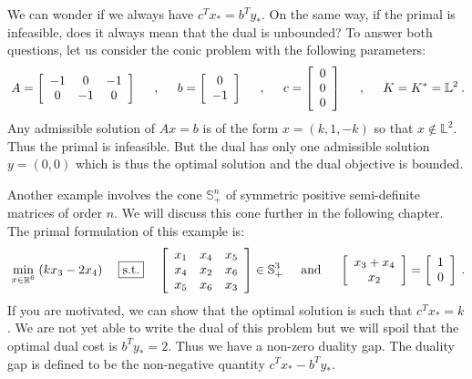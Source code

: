 \documentclass[12pt,a4paper]{article}
\theoremstyle{definition}
\theoremstyle{plain}
\DeclareMathOperator{\reals}{\mathbb{R}}
\DeclareMathOperator{\suchthat}{\;\;\;\;\boxed{\text{s.t.}}\;\;\;\;}
\begin{document}
We can wonder if we always have $c^Tx_* = b^Ty_*$. On the same way, if the primal is infeasible, does it always mean that the dual is unbounded? To answer both questions, let us consider the conic problem with the following parameters:
\begin{align*}
\: A = \left[\begin{array}{ccc} -1 & 0 & -1 \\ 0 & -1 & 0 \end{array}\right] \hspace{5mm},\hspace{5mm}
b = \left[\begin{array}{c} 0 \\ -1 \end{array}\right] \hspace{5mm},\hspace{5mm}
c = \left[\begin{array}{c} 0 \\ 0 \\ 0 \end{array}\right] \hspace{5mm},\hspace{5mm}
K = K^* = \mathbb{L}^2 \:.
\end{align*}
Any admissible solution of $Ax=b$ is of the form $x=(k,1,-k)$ so that $x\notin \mathbb{L}^2$. Thus the primal is infeasible. But the dual has only one admissible solution $y=(0,0)$ which is thus the optimal solution and the dual objective is bounded.

Another example involves the cone $\mathbb{S}^n_+$ of symmetric positive semi-definite matrices of order $n$. We will discuss this cone further in the following chapter. The primal formulation of this example is:
\begin{align*}
\: \min_{x\in\reals^6}\; (kx_3 - 2x_4) \suchthat \left[\begin{array}{ccc} x_1 & x_4 & x_5 \\ x_4 & x_2 & x_6 \\ x_5 & x_6 & x_3 \end{array}\right] \in \mathbb{S}^3_+ \hspace{5mm}\text{and}\hspace{5mm}
\left[\begin{array}{c} x_3 + x_4 \\ x_2 \end{array}\right] = \left[\begin{array}{c} 1 \\ 0 \end{array}\right] \:.
\end{align*}
If you are motivated, we can show that the optimal solution is such that $c^Tx_* = k$. We are not yet able to write the dual of this problem but we will spoil that the optimal dual cost is $b^Ty_* = 2$. Thus we have a non-zero duality gap. The duality gap is defined to be the non-negative quantity $c^Tx_* - b^Ty_*$.
\end{document}

